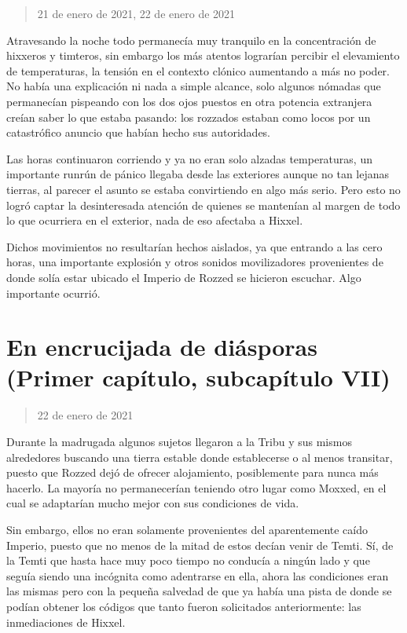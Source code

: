 \documentclass[
  spanish,
]{book}
\begin{document}
\begin{quote}
21 de enero de 2021, 22 de enero de 2021
\end{quote}

Atravesando la noche todo permanecía muy tranquilo en la concentración de hixxeros y timteros, sin embargo los más atentos lograrían percibir el elevamiento de temperaturas, la tensión en el contexto clónico aumentando a más no poder. No había una explicación ni nada a simple alcance, solo algunos nómadas que permanecían pispeando con los dos ojos puestos en otra potencia extranjera creían saber lo que estaba pasando: los rozzados estaban como locos por un catastrófico anuncio que habían hecho sus autoridades.

Las horas continuaron corriendo y ya no eran solo alzadas temperaturas, un importante runrún de pánico llegaba desde las exteriores aunque no tan lejanas tierras, al parecer el asunto se estaba convirtiendo en algo más serio. Pero esto no logró captar la desinteresada atención de quienes se mantenían al margen de todo lo que ocurriera en el exterior, nada de eso afectaba a Hixxel.

Dichos movimientos no resultarían hechos aislados, ya que entrando a las cero horas, una importante explosión y otros sonidos movilizadores provenientes de donde solía estar ubicado el Imperio de Rozzed se hicieron escuchar. Algo importante ocurrió.

\hypertarget{en-encrucijada-de-diuxe1sporas-primer-capuxedtulo-subcapuxedtulo-vii}{%
\section{En encrucijada de diásporas (Primer capítulo, subcapítulo VII)}\label{en-encrucijada-de-diuxe1sporas-primer-capuxedtulo-subcapuxedtulo-vii}}

\begin{quote}
22 de enero de 2021
\end{quote}

Durante la madrugada algunos sujetos llegaron a la Tribu y sus mismos alrededores buscando una tierra estable donde establecerse o al menos transitar, puesto que Rozzed dejó de ofrecer alojamiento, posiblemente para nunca más hacerlo. La mayoría no permanecerían teniendo otro lugar como Moxxed, en el cual se adaptarían mucho mejor con sus condiciones de vida.

Sin embargo, ellos no eran solamente provenientes del aparentemente caído Imperio, puesto que no menos de la mitad de estos decían venir de Temti. Sí, de la Temti que hasta hace muy poco tiempo no conducía a ningún lado y que seguía siendo una incógnita como adentrarse en ella, ahora las condiciones eran las mismas pero con la pequeña salvedad de que ya había una pista de donde se podían obtener los códigos que tanto fueron solicitados anteriormente: las inmediaciones de Hixxel.
\end{document}
